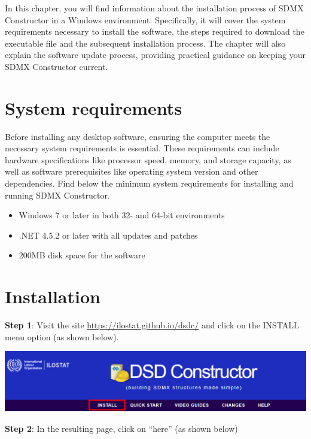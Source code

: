 \documentclass[
]{book}
\providecommand{\tightlist}{%
  \setlength{\itemsep}{0pt}\setlength{\parskip}{0pt}}
\theoremstyle{definition}
\theoremstyle{definition}
\theoremstyle{definition}
\theoremstyle{definition}
\theoremstyle{remark}
\begin{document}
In this chapter, you will find information about the installation process of SDMX Constructor in a Windows environment. Specifically, it will cover the system requirements necessary to install the software, the steps required to download the executable file and the subsequent installation process. The chapter will also explain the software update process, providing practical guidance on keeping your SDMX Constructor current.

\hypertarget{system-requirements}{%
\section{System requirements}\label{system-requirements}}

Before installing any desktop software, ensuring the computer meets the necessary system requirements is essential. These requirements can include hardware specifications like processor speed, memory, and storage capacity, as well as software prerequisites like operating system version and other dependencies. Find below the minimum system requirements for installing and running SDMX Constructor.

\begin{itemize}
\tightlist
\item
  Windows 7 or later in both 32- and 64-bit environments
\item
  .NET 4.5.2 or later with all updates and patches
\item
  200MB disk space for the software
\end{itemize}

\hypertarget{installation}{%
\section{Installation}\label{installation}}

\textbf{Step 1}: Visit the site \url{https://ilostat.github.io/dsdc/} and click on the INSTALL menu option (as shown below).

\begin{center}\includegraphics[width=1\linewidth]{./images/image003} \end{center}

\textbf{Step 2}: In the resulting page, click on ``here'' (as shown below)
\end{document}
